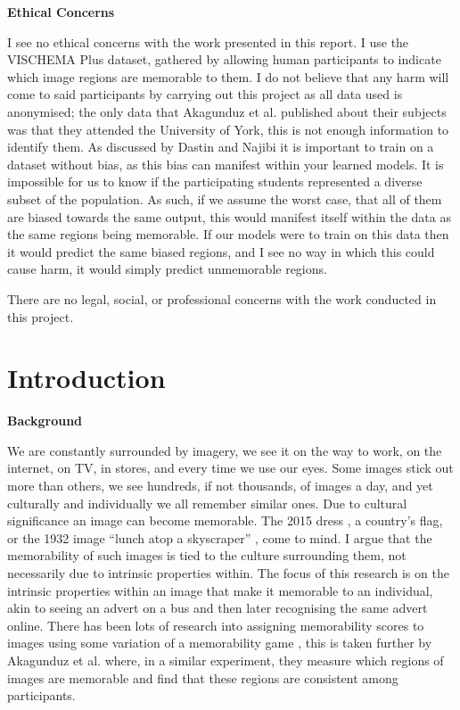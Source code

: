 \documentclass{UoYCSproject}
\begin{document}
\textbf{Ethical Concerns}

I see no ethical concerns with the work presented in this report. I use the VISCHEMA Plus dataset, gathered by allowing human participants to indicate which image regions are memorable to them. I do not believe that any harm will come to said participants by carrying out this project as all data used is anonymised; the only data that Akagunduz et al. published about their subjects was that they attended the University of York, this is not enough information to identify them. As discussed by Dastin \cite{dastin_2018} and Najibi \cite{najibi_2020} it is important to train on a dataset without bias, as this bias can manifest within your learned models. It is impossible for us to know if the participating students represented a diverse subset of the population. As such, if we assume the worst case, that all of them are biased towards the same output, this would manifest itself within the data as the same regions being memorable. If our models were to train on this data then it would predict the same biased regions, and I see no way in which this could cause harm, it would simply predict unmemorable regions.

There are no legal, social, or professional concerns with the work conducted in this project.

\chapter{Introduction}

\textbf{Background}

We are constantly surrounded by imagery, we see it on the way to work, on the internet, on TV, in stores, and every time we use our eyes. Some images stick out more than others, we see hundreds, if not thousands, of images a day, and yet culturally and individually we all remember similar ones. Due to cultural significance an image can become memorable. The 2015 dress \cite{BBCDress2015}, a country's flag, or the 1932 image “lunch atop a skyscraper” \cite{gambino_2012}, come to mind. I argue that the memorability of such images is tied to the culture surrounding them, not necessarily due to intrinsic properties within. The focus of this research is on the intrinsic properties within an image that make it memorable to an individual, akin to seeing an advert on a bus and then later recognising the same advert online.
There has been lots of research into assigning memorability scores to images using some variation of a memorability game \cite{Isola2011, IsolaParikhTorralbaOliva2011, ICCV15_Khosla, isola2014memorability}, this is taken further by Akagunduz et al. \cite{VischemaPaper} where, in a similar experiment, they measure which regions of images are memorable and find that these regions are consistent among participants.
\end{document}
